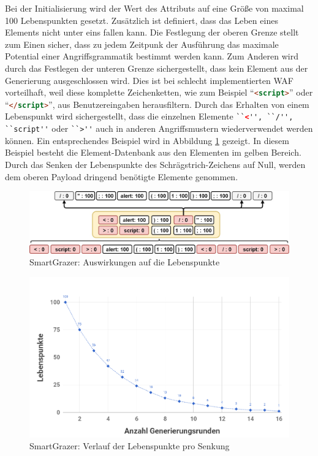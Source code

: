Bei der Initialisierung wird der Wert des Attributs auf eine Größe von maximal 100 Lebenspunkten  gesetzt. Zusätzlich ist definiert, dass das Leben eines Elements nicht unter eins fallen kann. Die Festlegung der oberen Grenze stellt zum Einen sicher, dass zu jedem Zeitpunk der Ausführung das maximale Potential einer Angriffsgrammatik bestimmt werden kann. Zum Anderen wird durch das Festlegen der unteren Grenze sichergestellt, dass kein Element aus der Generierung ausgeschlossen wird. Dies ist bei schlecht implementierten WAF vorteilhaft, weil diese komplette Zeichenketten, wie zum Beispiel ``\lstinline[language=html]!<script>!'' oder ``\lstinline[language=html]!</script>!'', aus Benutzereingaben herausfiltern. Durch das Erhalten von einem Lebenspunkt wird sichergestellt, dass die einzelnen Elemente \lstinline[language=html]!``<'', ``/'', ``script''! oder \lstinline[language=html]!``>''! auch in anderen Angriffsmustern wiederverwendet werden können. Ein entsprechendes Beispiel wird in Abbildung \ref{fig:SmartGrazerWeightedElementsKeepOne} gezeigt. In diesem Beispiel besteht die Element-Datenbank aus den Elementen im gelben Bereich. Durch das Senken der Lebenspunkte des Schrägstrich-Zeichens auf Null, werden dem oberen Payload dringend benötigte Elemente genommen.

\begin{figure}[htbp] 
	\centering
	\includegraphics[width=\textwidth]{contents/images/SmartGrazerWeightedElementsKeepOne}
	\caption{SmartGrazer: Auswirkungen auf die Lebenspunkte}
	\label{fig:SmartGrazerWeightedElementsKeepOne}
\end{figure}

\begin{figure}[htbp] 
	\centering
	\includegraphics[width=\textwidth]{contents/images/ElementsDecreasingLifepoints}
	\caption{SmartGrazer: Verlauf der Lebenspunkte pro Senkung}
	\label{fig:decreasing-Lifepoints}
\end{figure}

